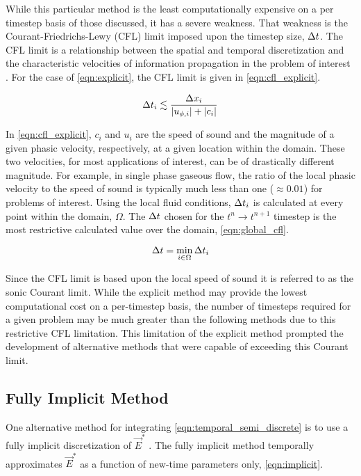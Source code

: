 While this particular method is the least computationally expensive on a per timestep basis of those discussed, it has a severe weakness.
That weakness is the Courant-Friedrichs-Lewy (CFL) limit imposed upon the timestep size, $\dt{}$.
The CFL limit is a relationship between the spatial and temporal discretization and the characteristic velocities of information propagation in the problem of interest \cite{LeVeque2007, Tannehill1997}.
For the case of \eqref{eqn:explicit}, the CFL limit is given in \eqref{eqn:cfl_explicit}.

\begin{equation}
\label{eqn:cfl_explicit}
\dt{}_i \lesssim \frac{\dx{}_i}{|u_{\phi,i}|+|c_i|}
\end{equation}

In \eqref{eqn:cfl_explicit}, $c_i$ and $u_i$ are the speed of sound and the magnitude of a given phasic velocity, respectively, at a given location within the domain.
These two velocities, for most applications of interest, can be of drastically different magnitude.
For example, in single phase gaseous flow, the ratio of the local phasic velocity to the speed of sound is typically much less than one ($\approx 0.01$) for problems of interest.
Using the local fluid conditions, $\dt{}_i$ is calculated at every point within the domain, $\Omega$.
The $\dt{}$ chosen for the $t^{n} \rightarrow t^{n+1}$ timestep is the most restrictive calculated value over the domain, \eqref{eqn:global_cfl}.

\begin{equation}
\label{eqn:global_cfl}
\dt{} = \min_{i \in \Omega} \dt{}_i
\end{equation}

Since the CFL limit is based upon the local speed of sound it is referred to as the sonic Courant limit.
While the explicit method may provide the lowest computational cost on a per-timestep basis, the number of timesteps required for a given problem may be much greater than the following methods due to this restrictive CFL limitation.
This limitation of the explicit method prompted the development of alternative methods that were capable of exceeding this Courant limit.

\subsection{Fully Implicit Method}
\label{subsect:numerics_fully_implicit}
One alternative method for integrating \eqref{eqn:temporal_semi_discrete} is to use a fully implicit discretization of $\vec{E}^{*}$ \cite{Frepoli2003, Barre1990}.
The fully implicit method temporally approximates $\vec{E}^{*}$ as a function  of new-time parameters only, \eqref{eqn:implicit}.

